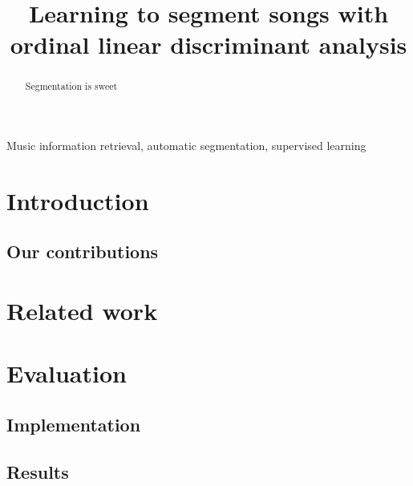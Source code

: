 \documentclass{article}
\title{Learning to segment songs with ordinal linear discriminant analysis}
\begin{document}
%
\maketitle
%
\begin{abstract}
Segmentation is sweet
\end{abstract}
%
\begin{keywords}
Music information retrieval, automatic segmentation, supervised learning
\end{keywords}
%
\section{Introduction}
\label{sec:intro}

\subsection{Our contributions}

\section{Related work}
\label{sec:related}

\section{Evaluation}
\label{sec:eval}

\subsection{Implementation}

\subsection{Results}
\end{document}
